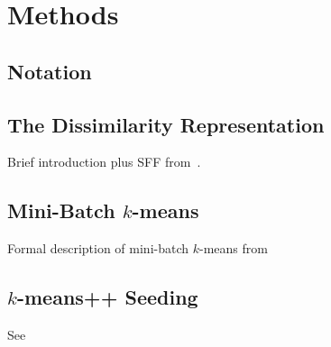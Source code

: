 \section{Methods}
\label{sec:methods}


\subsection{Notation}
\label{sec:notation}

\subsection{The Dissimilarity Representation}
Brief introduction plus SFF from~\cite{olivetti2012approximation}.

\subsection{Mini-Batch $k$-means}
Formal description of mini-batch $k$-means from~\cite{sculley2010web}

\subsection{$k$-means++ Seeding}
See~\cite{arthur2007kmeans}


